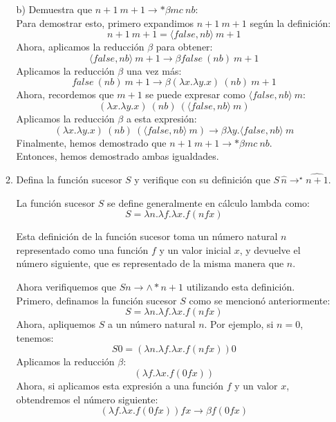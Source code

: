 \documentclass{article}
\begin{document}
\begin{enumerate}
\begin{enumerate}
            b) Demuestra que \(n+1\ m+1 \rightarrow*\beta mc\ nb\):\\
            Para demostrar esto, primero expandimos \(n+1\ m+1\) según la definición:\\
            \[
            n+1\ m+1 = ⟨false, nb⟩\ m+1
            \]
            Ahora, aplicamos la reducción $\beta$ para obtener:\\
            \[
            ⟨false, nb⟩\ m+1 \rightarrow\beta false\ (nb)\ m+1
            \]
            Aplicamos la reducción $\beta$ una vez más:
            \[
            false\ (nb)\ m+1 \rightarrow\beta (\lambda x.\lambda y.x)\ (nb)\ m+1
            \]
            Ahora, recordemos que \(m+1\) se puede expresar como \(⟨false, nb⟩\ m\):
            \[
            (\lambda x.\lambda y.x)\ (nb)\ (⟨false, nb⟩\ m)
            \]
            Aplicamos la reducción $\beta$ a esta expresión:
            \[
            (\lambda x.\lambda y.x)\ (nb)\ (⟨false, nb⟩\ m) \rightarrow\beta \lambda y.⟨false, nb⟩\ m
            \]
            Finalmente, hemos demostrado que \(n+1\ m+1 \rightarrow*\beta mc\ nb\).\\
            Entonces, hemos demostrado ambas igualdades.

            \item Defina la función sucesor $S$ y verifique con su definición que $S\,\widehat{n}\to^\star \widehat{n+1}$.

            La función sucesor \( S \) se define generalmente en cálculo lambda como:
            \[
            S = \lambda n. \lambda f. \lambda x. f (n f x)
            \]

            Esta definición de la función sucesor toma un número natural \( n \) representado como una función \( f \) y un valor inicial \( x \), y devuelve el número siguiente, que es representado de la misma manera que \( n \).

            Ahora verifiquemos que \( S n \rightarrow\land* n + 1 \) utilizando esta definición.
            Primero, definamos la función sucesor \( S \) como se mencionó anteriormente:
            \[
            S = \lambda n. \lambda f. \lambda x. f (n f x)
            \]
            Ahora, apliquemos \( S \) a un número natural \( n \). Por ejemplo, si \( n = 0 \), tenemos:
            \[
            S 0 = (\lambda n. \lambda f. \lambda x. f (n f x)) 0
            \]
            Aplicamos la reducción \( \beta \):
            \[
            (\lambda f. \lambda x. f (0 f x))
            \]
            Ahora, si aplicamos esta expresión a una función \( f \) y un valor \( x \), obtendremos el número siguiente:\\
            \[
            (\lambda f. \lambda x. f (0 f x)) f x \rightarrow \beta f (0 f x)
            \]


\end{enumerate}
\end{enumerate}
\end{document}
